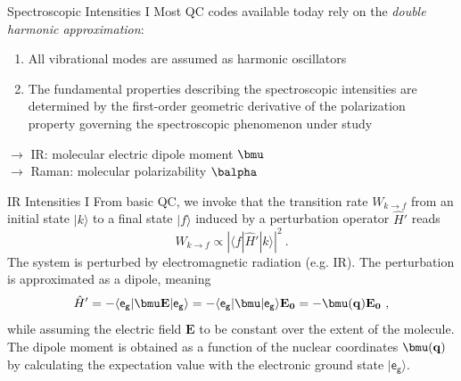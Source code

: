 \documentclass[t]{beamer}
\begin{document}
	\begin{frame}{Spectroscopic Intensities I}
	    Most QC codes available today rely on the \textit{double harmonic approximation}:
	    \begin{enumerate}
	        \item All vibrational modes are assumed as harmonic oscillators
	        \item The fundamental properties describing the spectroscopic intensities are determined by the first-order geometric derivative of the polarization property governing the spectroscopic phenomenon under study \\
	    \end{enumerate}
	    $\longrightarrow$ IR: \pause molecular electric dipole moment $\bmu$ \\
	    $\longrightarrow$ Raman: \pause molecular polarizability $\balpha$
	\end{frame}
	\begin{frame}{IR Intensities I}
	    From basic QC, we invoke that the transition rate $W_{k\rightarrow f}$ from an initial state $|k\rangle$ to a final state $|f\rangle$ induced by a perturbation operator $\hat{H}'$ reads \pause
	    \begin{equation*}
	        W_{k\rightarrow f}\propto \left| \langle f | \hat{H}' | k \rangle \right|^2~.
	    \end{equation*}
	    The system is perturbed by electromagnetic radiation (e.g. IR). The perturbation is approximated as a dipole, meaning 
	    \begin{equation*}
	        \hat{H}' = - \langle \mathsf{e_g} | \bmu\mathbf{E} | \mathsf{e_g} \rangle 
	        = - \langle \mathsf{e_g} | \bmu | \mathsf{e_g} \rangle \mathbf{E_0}
	        = - \bmu(\mathbf{q}) \mathbf{E_0}~,
	    \end{equation*}
	    while assuming the electric field $\mathbf{E}$ to be constant over the extent of the molecule. The dipole moment is obtained as a function of the nuclear coordinates $\bmu(\mathbf{q})$ by calculating the expectation value with the electronic ground state $| \mathsf{e_g} \rangle$. 
	\end{frame}
\end{document}
